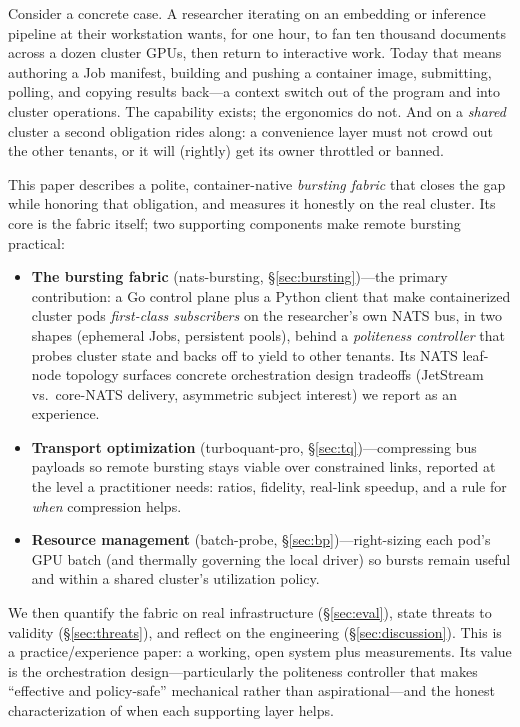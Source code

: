 \documentclass[conference]{IEEEtran}
\begin{document}
Consider a concrete case. A researcher iterating on an embedding or inference pipeline at their
workstation wants, for one hour, to fan ten thousand documents across a dozen cluster GPUs, then
return to interactive work. Today that means authoring a Job manifest, building and pushing a
container image, submitting, polling, and copying results back---a context switch out of the
program and into cluster operations. The capability exists; the ergonomics do not. And on a
\emph{shared} cluster a second obligation rides along: a convenience layer must not crowd out the
other tenants, or it will (rightly) get its owner throttled or banned.

This paper describes a polite, container-native \emph{bursting fabric} that closes the gap while
honoring that obligation, and measures it honestly on the real cluster. Its core is the fabric
itself; two supporting components make remote bursting practical:

\begin{itemize}
\item \textbf{The bursting fabric} (nats-bursting, \S\ref{sec:bursting})---the primary
contribution: a Go control plane plus a Python client that make containerized cluster pods
\emph{first-class subscribers} on the researcher's own NATS bus, in two shapes (ephemeral Jobs,
persistent pools), behind a \emph{politeness controller} that probes cluster state and backs off
to yield to other tenants. Its NATS leaf-node topology surfaces concrete orchestration design
tradeoffs (JetStream vs.\ core-NATS delivery, asymmetric subject interest) we report as an
experience.
\item \textbf{Transport optimization} (turboquant-pro, \S\ref{sec:tq})---compressing bus payloads
so remote bursting stays viable over constrained links, reported at the level a practitioner
needs: ratios, fidelity, real-link speedup, and a rule for \emph{when} compression helps.
\item \textbf{Resource management} (batch-probe, \S\ref{sec:bp})---right-sizing each pod's GPU
batch (and thermally governing the local driver) so bursts remain useful and within a shared
cluster's utilization policy.
\end{itemize}

We then quantify the fabric on real infrastructure (\S\ref{sec:eval}), state threats to validity
(\S\ref{sec:threats}), and reflect on the engineering (\S\ref{sec:discussion}). This is a
practice/experience paper: a working, open system plus measurements. Its value is the
orchestration design---particularly the politeness controller that makes ``effective and
policy-safe'' mechanical rather than aspirational---and the honest characterization of when each
supporting layer helps.
\end{document}
